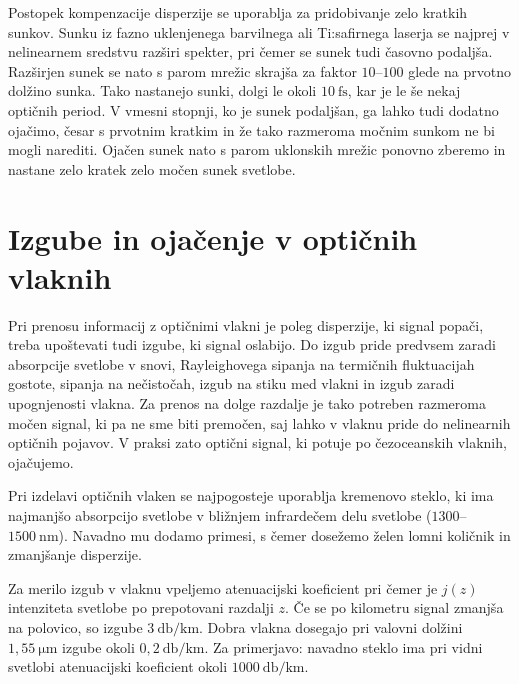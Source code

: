 \begin{remark}
Postopek kompenzacije disperzije se uporablja za pridobivanje zelo 
kratkih sunkov. Sunku iz fazno uklenjenega barvilnega 
ali Ti:safirnega
laserja se najprej v nelinearnem sredstvu razširi spekter, pri čemer
se sunek tudi časovno podaljša. Razširjen sunek se nato s parom mrežic skrajša
za faktor $10$--$100$ glede na prvotno dolžino sunka. Tako nastanejo sunki,
dolgi le okoli $10~\si{\femto\second}$, kar je le še nekaj optičnih period. 
V vmesni stopnji, ko je sunek podaljšan, ga lahko tudi dodatno ojačimo, česar
s prvotnim kratkim in že tako razmeroma močnim sunkom ne bi mogli narediti. Ojačen
sunek nato s parom uklonskih mrežic ponovno zberemo in nastane zelo kratek
zelo močen sunek svetlobe.
\end{remark}

\section{Izgube in ojačenje v optičnih vlaknih}
Pri prenosu informacij z optičnimi vlakni je poleg disperzije, ki signal popači,
treba upoštevati tudi izgube, ki signal oslabijo. 
Do izgub pride predvsem zaradi absorpcije svetlobe v snovi,
Rayleighovega sipanja na termičnih fluktuacijah gostote, 
sipanja na nečistočah, 
izgub na stiku med vlakni in izgub zaradi upognjenosti vlakna. Za prenos na dolge
razdalje je tako potreben razmeroma močen signal, ki pa ne sme biti premočen,
saj lahko v vlaknu pride do nelinearnih optičnih pojavov. V praksi zato 
optični signal, ki potuje po čezoceanskih vlaknih, ojačujemo. 

Pri izdelavi optičnih vlaken se najpogosteje uporablja kremenovo steklo, ki 
ima najmanjšo absorpcijo svetlobe v bližnjem infrardečem delu svetlobe
($1300$--$1500~\si{\nano\meter}$).
Navadno mu dodamo primesi, s čemer dosežemo želen lomni količnik in 
zmanjšanje disperzije. 

Za merilo izgub v vlaknu vpeljemo atenuacijski 
koeficient
pri čemer je $j(z)$ intenziteta svetlobe po prepotovani razdalji $z$. Če se po 
kilometru signal zmanjša na polovico, so izgube $3~\si{\decibel/\kilo\meter}$.
Dobra vlakna dosegajo pri valovni dolžini $1,55~\si{\micro\meter}$ izgube okoli 
$0,2~\si{\decibel/\kilo\meter}$. 
Za primerjavo: navadno steklo ima pri vidni svetlobi atenuacijski koeficient okoli 
$1000~\si{\decibel/\kilo\meter}$.

